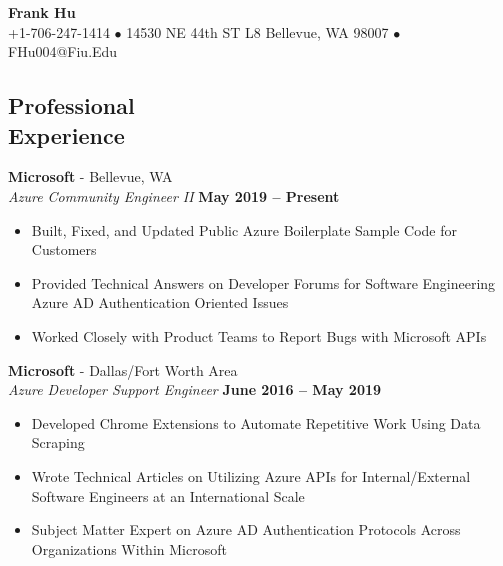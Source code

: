 \documentclass[margin,line]{resume}
\begin{document}
	{\centering \LARGE{\textbf{Frank Hu}}}
	\\
	\normalsize
	+1-706-247-1414 $\bullet$ 14530 NE 44th ST L8 Bellevue, WA 98007 $\bullet$ FHu004@Fiu.Edu
	
	\begin{resume}	
	\section{\mysidestyle Professional\\Experience}
	
	\textbf{Microsoft} - Bellevue, WA \vspace{1mm}\\\vspace{1mm}
	\textsl{Azure Community Engineer II} \hfill \textbf{May 2019 -- Present}
	\begin{itemize}
		\item Built, Fixed, and Updated Public Azure Boilerplate Sample Code for Customers
		\item Provided Technical Answers on Developer Forums for Software Engineering \\Azure AD Authentication Oriented Issues
		\item Worked Closely with Product Teams to Report Bugs with Microsoft APIs
	\end{itemize}
		
	\textbf{Microsoft} - Dallas/Fort Worth Area\vspace{1mm}\\\vspace{1mm}
	\textsl{Azure Developer Support Engineer} \hfill \textbf{June 2016 -- May 2019}
	\begin{itemize}
		 \item Developed Chrome Extensions to Automate Repetitive Work Using Data Scraping
		 \item Wrote Technical Articles on Utilizing Azure APIs for Internal/External Software Engineers at an International Scale
		 \item Subject Matter Expert on Azure AD Authentication Protocols Across Organizations Within Microsoft
	
	\end{itemize}


\end{resume}
\end{document}
